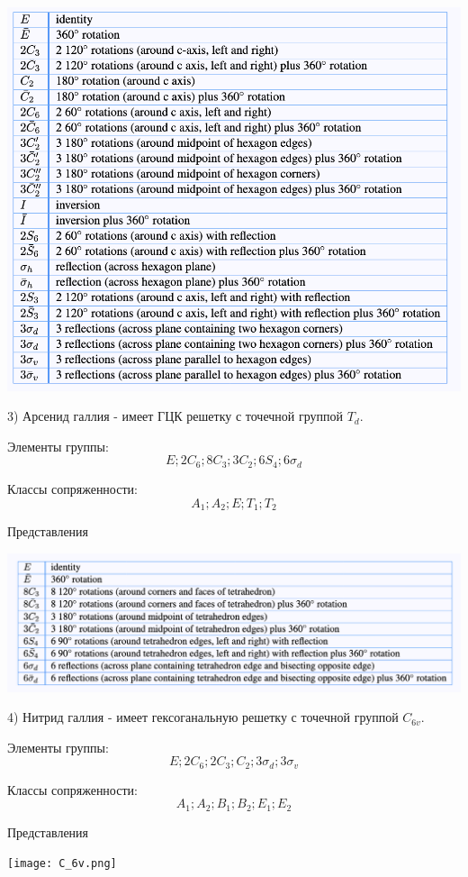 \documentclass[12pt]{article}
\begin{document}
\begin{large}
\includegraphics[width=1\textwidth]{D_6h.png}
\par
\par 3) Арсенид галлия - имеет ГЦК решетку с точечной группой $T_{d}$.
\par Элементы группы:
\[
    E; 2C_6; 8C_3; 3C_2; 6S_4; 6\sigma_d
\]
\par Классы сопряженности:
\[
    A_{1}; A_{2}; E; T_{1}; T_{2}
\]
\par Представления
\par
\includegraphics[width=1\textwidth]{Td.png}
\par
\par 4) Нитрид галлия - имеет гексоганальную решетку с точечной группой $C_{6v}$.
\par Элементы группы:
\[
    E; 2C_6; 2C_3; C_2; 3\sigma_d; 3\sigma_v
\]
\par Классы сопряженности:
\[
    A_{1}; A_{2}; B_{1}; B_{2}; E_{1}; E_{2}
\]
\par Представления
\par
\texttt{[image: С\_6v.png]}
\par

\end{large}
\end{document}
